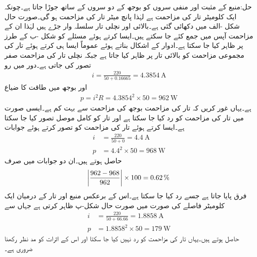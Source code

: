 حل:منبع کے مثبت اور منفی سروں کو بوجھ کے دو سروں کے ساتھ جوڑا جاتا ہے۔چونکہ ایک کلومیٹر تار کی مزاحمت  ہے لہٰذا پانچ میٹر تار کی مزاحمت  ہو گی۔صورت حال شکل -الف میں دکھائی گئی ہے۔بالائی اور نچلی تار سلسلہ وار جڑے ہیں لہٰذا ان کے مزاحمت آپس میں جمع کئے جا سکتے ہیں۔ایسا کرتے ہوئے مسئلے کو شکل  -ب کے طرز پر ظاہر کیا جا سکتا ہے۔ادوار کے اشکال بناتے ہوئے عموماً ایسا ہی کرتے ہوئے تار کی مجموعی مزاحمت کو بالائی تار پر ظاہر کیا جاتا ہے جبکہ نچلی تار کی مزاحمت صفر تصور کی جاتی ہے۔دور میں رو
\begin{align*}
i=\frac{220}{50+0.16665}=\SI{4.3854}{\ampere}
\end{align*}
اور  بوجھ میں طاقت کا ضیاع
\begin{align*}
p=i^2 R=4.3854^2 \times 50=\SI{962}{\watt}
\end{align*}
ہے۔یہاں غور کریں کہ تار کی مزاحمت بوجھ کی مزاحمت سے بہت کم ہے۔ایسی صورت میں تار کی مزاحمت کو رد کیا جا سکتا ہے اور تار کو کامل موصل تصور کیا جا سکتا ہے۔ایسا کرتے ہوئے تار کی مزاحمت کو  تصور کرتے ہوئے جوابات
\begin{align*}
i&=\frac{220}{50+0}=\SI{4.4}{\ampere}\\
p&=4.4^2 \times 50=\SI{968}{\watt}
\end{align*}
حاصل ہوتے ہیں۔ان دو جوابات میں صرف
\begin{align*}
\abs{\frac{962-968}{962}}\times 100=\SI{0.62}{\percent}
\end{align*}
فرق پایا جاتا ہے جسے رد کیا جا سکتا ہے۔اس کے برعکس منبع اور تار کے درمیان ایک کلومیٹر فاصلے کی صورت میں صورت حال شکل-پ ظاہر کرتی ہے جہاں سے
\begin{align*}
i&=\frac{220}{50+66.66}=\SI{1.8858}{\ampere}\\
p&=1.8858^2 \times 50=\SI{179}{\watt}
\end{align*}
حاصل ہوتے ہیں۔یہاں تار کی مزاحمت کو رد نہیں کیا جا سکتا اور اس کے اثرات کو مد نظر رکھنا ضروری ہے۔

